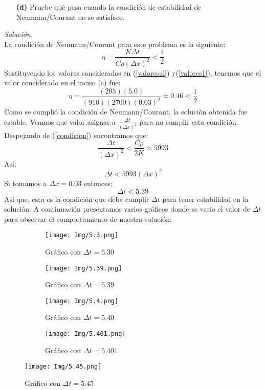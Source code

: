 \documentclass[11pt]{article}
\begin{document}
\begin{enumerate}
	\item [\textbf{(d)}] Pruebe qué pasa cuando la condición de estabilidad de Neumann/Courant
	no se satisface.
\end{enumerate}
\textit{Solución.}\\
	La condición de Neumann/Courant para este problema es la siguiente:
	\begin{equation}
		\eta = \frac{K \Delta t }{C\rho (\Delta x)^2}<\frac{1}{2} \label{condicion}
	\end{equation}
	Sustituyendo los valores considerados en (\ref{valoresal}) y(\ref{valores1}), tenemos que el valor considerado en el inciso (c) fue:
	$$\eta =\frac{(205)(5.0)}{(910)(2700)(0.03)^2}\approx 0.46<\frac{1}{2}$$
	Como se cumplió la condición de Neumann/Courant, la solución obtenida fue estable. Veamos que valor asignar a $\frac{\Delta t}{(\Delta x)^2}$ para no cumplir esta condición. Despejando de (\ref{condicion}) encontramos que:
	\begin{equation}
		\frac{\Delta t}{(\Delta x)^2} < \frac{C\rho}{2 K } \approx 5993	\label{cond}
	\end{equation}
	Así:
	$$\Delta t < 5993 (\Delta x)^2$$
	Si tomamos a $\Delta x = 0.03$ entonces: 
	$$\Delta t < 5.39$$
	Así que, esta es la condición que debe cumplir $\Delta t$ para tener estabilidad en la solución. A continuación presentamos varios gráficos donde se vario el valor de $\Delta t$ para observar el comportamiento de nuestra solución:
	\begin{figure}[h]
		\begin{subfigure}[b]{0.49\textwidth}
			\centering
			\texttt{[image: Img/5.3.png]}
			\caption{Gráfico con $\Delta t = 5.30$}
			\label{}
		\end{subfigure}
		\hfill
		\begin{subfigure}[b]{0.49\textwidth}
			\centering
			\texttt{[image: Img/5.39.png]}
			\caption{Gráfico con $\Delta t = 5.39$}
			\label{}
		\end{subfigure}
		\caption{}
	\end{figure}

	\begin{figure}[h]
		\begin{subfigure}[b]{0.49\textwidth}
			\centering
			\texttt{[image: Img/5.4.png]}
			\caption{Gráfico con $\Delta t = 5.40$}
			\label{}
		\end{subfigure}
		\hfill
		\begin{subfigure}[b]{0.49\textwidth}
			\centering
			\texttt{[image: Img/5.401.png]}
			\caption{Gráfico con $\Delta t = 5.401$}
			\label{}
		\end{subfigure}
		\caption{}
	\end{figure}
\newpage
	\begin{figure}[h]
		\centering
		\texttt{[image: Img/5.45.png]}
		\caption{Gráfico con $\Delta t = 5.45$}
		\label{}
	\end{figure}
\end{document}
